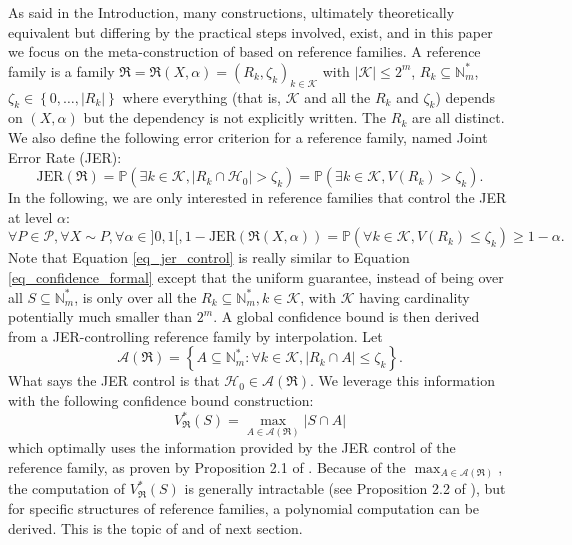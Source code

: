 \documentclass[
  11pt,
  a4paper,
]{article}
\theoremstyle{plain}
\theoremstyle{plain}
\theoremstyle{plain}
\theoremstyle{definition}
\theoremstyle{definition}
\theoremstyle{remark}
\begin{document}
As said in the Introduction, many constructions, ultimately
theoretically equivalent but differing by the practical steps involved,
exist, and in this paper we focus on the meta-construction of
\citet{MR4124323} based on reference families. A reference family is a
family
\(\mathfrak{R}=\mathfrak{R}(X,\alpha)=(R_k,\zeta_k)_{k\in \mathcal K}\)
with \(|\mathcal K|\leq 2^m\), \(R_k\subseteq\mathbb{N}_m^*\),
\(\zeta_k\in\left\{0,\dotsc,|R_k|\right\}\) where everything (that is,
\(\mathcal K\) and all the \(R_k\) and \(\zeta_k\)) depends on
\((X,\alpha)\) but the dependency is not explicitly written. The \(R_k\)
are all distinct. We also define the following error criterion for a
reference family, named Joint Error Rate (JER): \begin{equation}
\mathrm{JER}(\mathfrak{R}) = \mathbb{P}\left(\exists k\in\mathcal K, |R_k\cap\mathcal{H}_0| > \zeta_k \right) = \mathbb{P}\left(\exists k\in\mathcal K, V(R_k) > \zeta_k \right).
\label{eq_jer}
\end{equation} In the following, we are only interested in reference
families that control the JER at level \(\alpha\): \begin{equation}
\forall P\in\mathcal P, \forall X\sim P, \forall \alpha \in ]0,1[, 1-\mathrm{JER}(\mathfrak{R}(X,\alpha))=\mathbb{P}\left(\forall k\in\mathcal K, V(R_k)\leq \zeta_k\right) \geq 1-\alpha.
\label{eq_jer_control}
\end{equation} Note that Equation \eqref{eq_jer_control} is really
similar to Equation \eqref{eq_confidence_formal} except that the uniform
guarantee, instead of being over all \(S\subseteq \mathbb{N}_m^*\), is
only over all the \(R_k\subseteq \mathbb{N}_m^*, k\in\mathcal K\), with
\(\mathcal K\) having cardinality potentially much smaller than \(2^m\).
A global confidence bound is then derived from a JER-controlling
reference family by interpolation. Let \begin{equation}
\mathcal A(\mathfrak{R})= \left\{A\subseteq \mathbb{N}_m^*:  \forall k\in\mathcal K, |R_k\cap A| \leq \zeta_k \right\}.
\label{eq_a}
\end{equation} What says the JER control is that
\(\mathcal{H}_0\in\mathcal A(\mathfrak{R})\). We leverage this
information with the following confidence bound construction:
\begin{equation}
V^*_{\mathfrak{R}}(S) = \max_{A\in\mathcal A(\mathfrak{R})}|S\cap A|
\label{eq-vstar}
\end{equation} which optimally uses the information provided by the JER
control of the reference family, as proven by Proposition 2.1 of
\citet{MR4124323}. Because of the
\(\max_{A\in\mathcal A(\mathfrak{R})}\), the computation of
\(V^*_{\mathfrak{R}}(S)\) is generally intractable (see Proposition 2.2
of \citet{MR4124323}), but for specific structures of reference
families, a polynomial computation can be derived. This is the topic of
\citet{MR4178188} and of next section.
\end{document}
